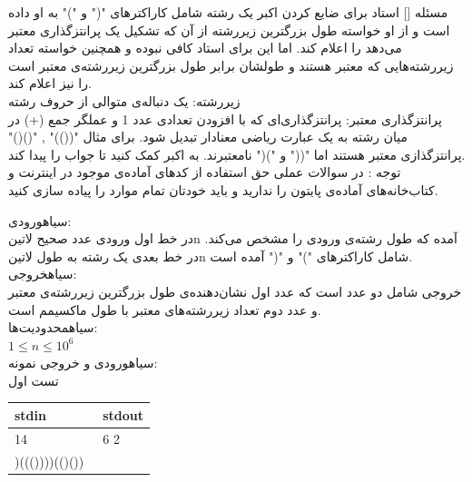 

‌مسئله []
استاد برای ضایع کردن اکبر یک رشته شامل کاراکتر‌های "(" و ")" به او داده است و از او خواسته طول بزرگترین زیررشته از آن که تشکیل یک پرانتزگذاری معتبر می‌دهد را اعلام کند. اما این برای استاد کافی نبوده و همچنین خواسته تعداد زیررشته‌هایی که معتبر هستند و طولشان برابر طول بزرگترین زیررشته‌ی معتبر است را نیز  اعلام کند.\\
زیررشته: یک دنباله‌ی متوالی از حروف رشته\\
پرانتزگذاری معتبر: پرانتزگذاری‌ای که با افزودن تعدادی عدد 1 و عملگر جمع (+) در میان رشته به یک عبارت ریاضی معنادار تبدیل شود. برای مثال "(())" , "()()" پرانتزگذازی معتبر هستند اما "((" و ")(" نامعتبرند.
به اکبر کمک کنید تا جواب را پیدا کند.\\
توجه : در سوالات عملی حق استفاده از کد‌های آماده‌ی موجود در اینترنت و کتاب‌خانه‌های آماده‌ی پایتون را ندارید و باید خودتان تمام موارد را پیاده سازی کنید.

‌سیاه{ورودی:}\\
در خط اول ورودی عدد صحیح ‌لاتین{n} آمده که طول رشته‌ی ورودی را مشخص می‌کند.
در خط بعدی یک رشته به طول ‌لاتین{n} شامل کاراکترهای ")" و "(" آمده است.\\
‌سیاه{خروجی:}\\
خروجی شامل دو عدد است که عدد اول نشان‌دهنده‌ی طول بزرگترین زیررشته‌ی معتبر و عدد دوم تعداد زیررشته‌های معتبر با طول ماکسیمم است.\\
‌سیاه{محدودیت‌ها:}\\
$1 \leq n \leq 10^{6}$\\

‌سیاه{ورودی و خروجی نمونه:}\\

تست اول
\begin{latin}
	\begin{tabularx}{\textwidth}{|X | X|}
		\hline
		\textbf{stdin} &
		\textbf{stdout}\\
		\hline
		14 & 6 2\\
		)((())))(()())\ & \\
		\hline
	\end{tabularx}
\end{latin}


